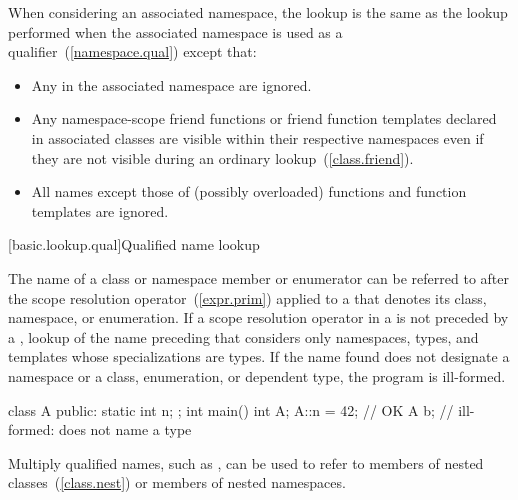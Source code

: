 \pnum
When considering an associated namespace, the lookup is the same as the
lookup performed when the associated namespace is used as a
qualifier~(\ref{namespace.qual}) except that:
\begin{itemize}
\item Any  in the associated namespace are
ignored.

\item Any namespace-scope friend functions or friend function templates
declared in associated classes are visible within their respective
namespaces even if they are not visible during an ordinary
lookup~(\ref{class.friend}).

\item All names except those of (possibly overloaded) functions and
function templates are ignored.
\end{itemize}

[basic.lookup.qual]{Qualified name lookup}

\pnum
{}%
%
%
The name of a class or namespace member
or enumerator can be referred to after the
\tcode{::} scope resolution operator~(\ref{expr.prim}) applied to a
 that denotes its class,
namespace, or enumeration.
If a
\tcode{::} scope resolution
operator
in a  is not preceded by a ,
lookup of the name preceding that \tcode{::} considers only namespaces, types, and
templates whose specializations are types. If the
name found does not designate a namespace or a class, enumeration, or dependent type,
the program is ill-formed. \begin{example}

\begin{codeblock}
class A {
public:
  static int n;
};
int main() {
  int A;
  A::n = 42;        // OK
  A b;              // ill-formed:  does not name a type
}
\end{codeblock}
\end{example}

\pnum
\begin{note} Multiply qualified names, such as , can
be used to refer to members of nested classes~(\ref{class.nest}) or
members of nested namespaces. \end{note}

